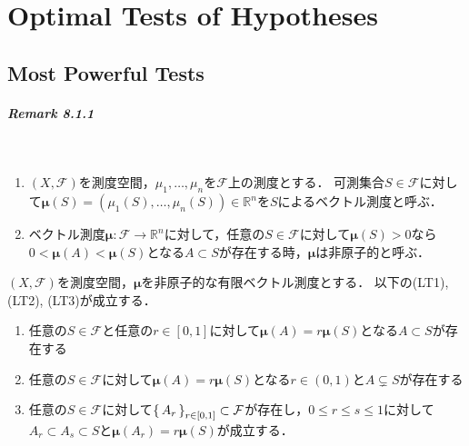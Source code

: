 \chapter{Optimal Tests of Hypotheses}
\section{Most Powerful Tests}
\paragraph{Remark 8.1.1}~
\begin{screen}
  \begin{dfn}
    \begin{enumerate}
      \item \((X, \mathcal{F})\)を測度空間，\(\mu_1, \ldots, \mu_n\)を\(\mathcal{F}\)上の測度とする．
      可測集合\(S \in \mathcal{F}\)に対して\(\boldsymbol\mu(S)=(\mu_1(S), \ldots, \mu_n(S)) \in \mathbb{R}^n\)を\(S\)によるベクトル測度と呼ぶ．
      \item ベクトル測度\(\boldsymbol\mu \colon \mathcal{F} \to \mathbb{R}^n\)に対して，任意の\(S \in \mathcal{F}\)に対して\(\boldsymbol\mu(S)>0\)なら\(0<\boldsymbol\mu(A)<\boldsymbol\mu(S)\)となる\(A \subset S\)が存在する時，\(\boldsymbol\mu\)は非原子的と呼ぶ．
    \end{enumerate}
  \end{dfn}
\end{screen}

\begin{screen}
  \begin{prop}
    \((X, \mathcal{F})\)を測度空間，\(\boldsymbol\mu\)を非原子的な有限ベクトル測度とする．
    以下の(LT1), (LT2), (LT3)が成立する．
    \begin{enumerate}[label=(LT\arabic*)]
      \item 任意の\(S \in \mathcal{F}\)と任意の\(r \in [0, 1]\)に対して\(\boldsymbol\mu(A)=r\boldsymbol\mu(S)\)となる\(A \subset S\)が存在する
      \item 任意の\(S \in \mathcal{F}\)に対して\(\boldsymbol\mu(A)=r\boldsymbol\mu(S)\)となる\(r \in (0, 1)\)と\(A \subsetneq S\)が存在する
      \item 任意の\(S \in \mathcal{F}\)に対して\(\set{A_r}_{r\in[0,1]} \subset \mathcal{F}\)が存在し，\(0\leq r \leq s \leq 1\)に対して\(A_r \subset A_s \subset S\)と\(\boldsymbol\mu(A_r)=r\boldsymbol\mu(S)\)が成立する．
    \end{enumerate}
  \end{prop}
\end{screen}

